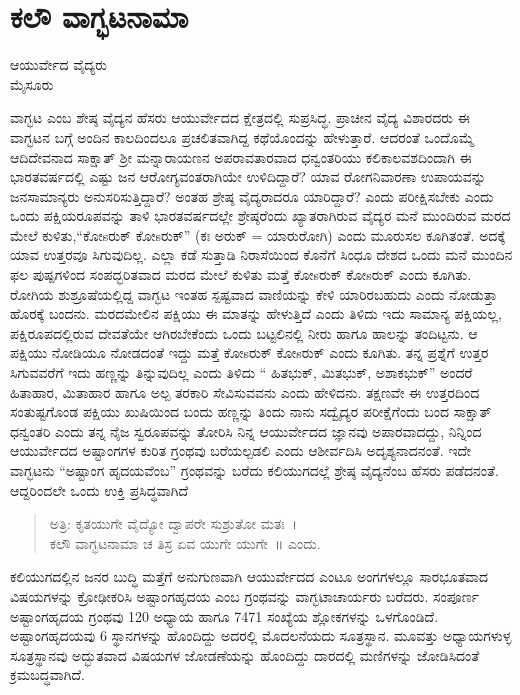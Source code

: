 {\fontsize{14}{16}\selectfont
{}
\chapter{ಕಲೌ ವಾಗ್ಭಟನಾಮಾ} 

\begin{center}
\smallskip

ಆಯುರ್ವೇದ ವೈದ್ಯರು\\
ಮೈಸೂರು
\addrule
\end{center}

ವಾಗ್ಭಟ ಎಂಬ ಶೇಷ್ಠ ವೈದ್ಯನ ಹೆಸರು ಆಯುರ್ವೇದದ ಕ್ಷೇತ್ರದಲ್ಲಿ ಸುಪ್ರಸಿದ್ಧ. ಪ್ರಾಚೀನ ವೈದ್ಯ ವಿಶಾರದರು ಈ ವಾಗ್ಭಟನ ಬಗ್ಗೆ ಅಂದಿನ ಕಾಲದಿಂದಲೂ ಪ್ರಚಲಿತವಾಗಿದ್ದ ಕಥೆಯೊಂದನ್ನು ಹೇಳುತ್ತಾರೆ. ಆದರಂತೆ ಒಂದೊಮ್ಮೆ ಆದಿದೇವನಾದ  ಸಾಕ್ಷಾತ್ ಶ್ರೀ ಮನ್ನಾರಾಯಣನ ಅಪರಾವತಾರವಾದ ಧನ್ವಂತರಿಯು ಕಲಿಕಾಲವಶದಿಂದಾಗಿ ಈ ಭಾರತವರ್ಷದಲ್ಲಿ ಎಷ್ಟು ಜನ ಆರೋಗ್ಯವಂತರಾಗಿಯೇ ಉಳಿದಿದ್ದಾರೆ? ಯಾವ ರೋಗನಿವಾರಣಾ ಉಪಾಯವನ್ನು ಜನಸಾಮಾನ್ಯರು ಅನುಸರಿಸುತ್ತಿದ್ದಾರೆ? ಅಂತಹ ಶ್ರೇಷ್ಠ ವೈದ್ಯರಾದರೂ ಯಾರಿದ್ದಾರೆ? ಎಂದು ಪರೀಕ್ಷಿಸಬೇಕು ಎಂದು ಒಂದು ಪಕ್ಷಿಯರೂಪವನ್ನು ತಾಳಿ ಭಾರತವರ್ಷದಲ್ಲೇ ಶ್ರೇಷ್ಠರೆಂದು ಖ್ಯಾತರಾಗಿರುವ ವೈದ್ಯರ ಮನೆ ಮುಂದಿರುವ ಮರದ ಮೇಲೆ ಕುಳಿತು,“ಕೋsರುಕ್ ಕೋsರುಕ್” (ಕಃ ಅರುಕ್ = ಯಾರು\break ರೋಗಿ) ಎಂದು ಮೂರುಸಲ ಕೂಗಿತಂತೆ. ಅದಕ್ಕೆ ಯಾವ ಉತ್ತರವೂ ಸಿಗುವುದಿಲ್ಲ. ಎಲ್ಲಾ ಕಡೆ ಸುತ್ತಾಡಿ ನಿರಾಸೆಯಿಂದ ಕೊನೆಗೆ ಸಿಂಧೂ ದೇಶದ ಒಂದು ಮನೆ ಮುಂದಿನ ಫಲ ಪುಷ್ಪಗಳಿಂದ ಸಂಪದ್ಭರಿತವಾದ ಮರದ ಮೇಲೆ ಕುಳಿತು ಮತ್ತೆ ಕೋsರುಕ್ ಕೋsರುಕ್ ಎಂದು ಕೂಗಿತು. ರೋಗಿಯ ಶುಶ್ರೂಷೆಯಲ್ಲಿದ್ದ ವಾಗ್ಭಟ ಇಂತಹ ಸ್ಪಷ್ಟವಾದ ವಾಣಿಯನ್ನು ಕೇಳಿ ಯಾರಿರಬಹುದು ಎಂದು ನೋಡುತ್ತಾ ಹೊರಕ್ಕೆ ಬಂದನು. ಮರದ\break ಮೇಲಿನ ಪಕ್ಷಿಯು ಈ ಮಾತನ್ನು ಹೇಳುತ್ತಿದೆ ಎಂದು ತಿಳಿದು ಇದು ಸಾಮಾನ್ಯ ಪಕ್ಷಿಯಲ್ಲ, ಪಕ್ಷಿರೂಪದಲ್ಲಿರುವ ದೇವತೆಯೇ ಆಗಿರಬೇಕೆಂದು ಒಂದು ಬಟ್ಟಲಿನಲ್ಲಿ ನೀರು ಹಾಗೂ ಹಾಲನ್ನು ತಂದಿಟ್ಟನು. ಆ ಪಕ್ಷಿಯು ನೋಡಿಯೂ ನೋಡದಂತೆ ಇದ್ದು ಮತ್ತೆ ಕೋsರುಕ್ ಕೋsರುಕ್ ಎಂದು ಕೂಗಿತು. ತನ್ನ ಪ್ರಶ್ನೆಗೆ ಉತ್ತರ ಸಿಗುವವರೆಗೆ ಇದು ಹಣ್ಣನ್ನು ತಿನ್ನುವುದಿಲ್ಲ ಎಂದು ತಿಳಿದು “ ಹಿತಭುಕ್, ಮಿತಭುಕ್, ಅಶಾಕಭುಕ್” ಅಂದರೆ ಹಿತಾಹಾರ, ಮಿತಾಹಾರ ಹಾಗೂ ಅಲ್ಪ ತರಕಾರಿ ಸೇವಿಸುವವನು ಎಂದು ಹೇಳಿದನು. ತಕ್ಷಣವೇ ಈ ಉತ್ತರದಿಂದ ಸಂತುಷ್ಟಗೊಂಡ ಪಕ್ಷಿಯು ಖುಷಿಯಿಂದ ಬಂದು ಹಣ್ಣನ್ನು ತಿಂದು ನಾನು ಸದ್ವೈದ್ಯರ ಪರೀಕ್ಷೆಗೆಂದು ಬಂದ ಸಾಕ್ಷಾತ್ ಧನ್ವಂತರಿ ಎಂದು ತನ್ನ ನೈಜ ಸ್ವರೂಪವನ್ನು ತೋರಿಸಿ ನಿನ್ನ ಆಯುರ್ವೇದದ ಜ್ಞಾನವು ಅಪಾರವಾದದ್ದು, ನಿನ್ನಿಂದ ಆಯುರ್ವೇದದ ಅಷ್ಟಾಂಗಗಳ ಕುರಿತ ಗ್ರಂಥವು ಬರೆಯಲ್ಪಡಲಿ ಎಂದು ಆಶೀರ್ವದಿಸಿ ಅದೃಶ್ಯನಾದನಂತೆ. ಇದೇ ವಾಗ್ಭಟನು “ಅಷ್ಟಾಂಗ ಹೃದಯವೆಂಬ” ಗ್ರಂಥವನ್ನು ಬರೆದು ಕಲಿಯುಗದಲ್ಲೆ ಶ್ರೇಷ್ಠ ವೈದ್ಯನೆಂಬ ಹೆಸರು ಪಡೆದನಂತೆ. ಆದ್ದರಿಂದಲೇ ಒಂದು ಉಕ್ತಿ ಪ್ರಸಿದ್ಧವಾಗಿದೆ 
\begin{verse}
ಅತ್ರಿ: ಕೃತಯುಗೇ ವೈದ್ಯೋ ದ್ವಾಪರೇ ಸುಶ್ರುತೋ ಮತಃ~। \\
ಕಲೌ ವಾಗ್ಭಟನಾಮಾ ಚ ತಿಸ್ರ ಏವ ಯುಗೇ ಯುಗೇ~॥ ಎಂದು.
\end{verse}
ಕಲಿಯುಗದಲ್ಲಿನ ಜನರ ಬುದ್ಧಿ ಮತ್ತೆಗೆ ಅನುಗುಣವಾಗಿ ಆಯುರ್ವೇದದ ಎಂಟೂ ಅಂಗಗಳಲ್ಲೂ ಸಾರಭೂತವಾದ ವಿಷಯಗಳನ್ನು ಕ್ರೋಢೀಕರಿಸಿ ಅಷ್ಟಾಂಗಹೃದಯ ಎಂಬ ಗ್ರಂಥವನ್ನು ವಾಗ್ಭಟಾಚಾರ್ಯರು ಬರೆದರು. ಸಂಪೂರ್ಣ ಅಷ್ಟಾಂಗ\-ಹೃದಯ ಗ್ರಂಥವು 120 ಅಧ್ಯಾಯ ಹಾಗೂ 7471 ಸಂಖ್ಯೆಯ ಶ್ಲೋಕಗಳನ್ನು ಒಳ\-ಗೊಂಡಿದೆ. ಅಷ್ಟಾಂಗಹೃದಯವು 6 ಸ್ಥಾನಗಳನ್ನು ಹೊಂದಿದ್ದು ಅದರಲ್ಲಿ ಮೊದಲನೆಯದು ಸೂತ್ರಸ್ಥಾನ. ಮೂವತ್ತು ಅಧ್ಯಾಯಗಳುಳ್ಳ ಸೂತ್ರಸ್ಥಾನವು ಅದ್ಭುತವಾದ ವಿಷಯ\-ಗಳ ಜೋಡಣೆ\-ಯನ್ನು ಹೊಂದಿದ್ದು ದಾರದಲ್ಲಿ ಮಣಿಗಳನ್ನು ಜೋಡಿಸಿದಂತೆ ಕ್ರಮಬದ್ಧ\-ವಾಗಿದೆ.

}
